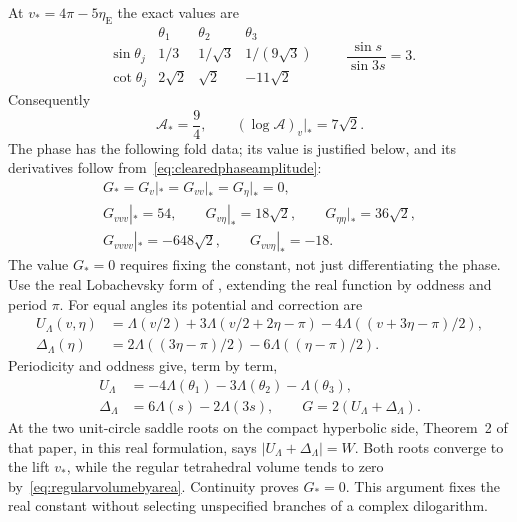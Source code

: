 At $v_*=4\pi-5\eta_{\mathrm E}$ the exact values are
\[
 \begin{array}{c|ccc}
 &\theta_1&\theta_2&\theta_3\\ \hline
 \sin\theta_j&1/3&1/\sqrt3&1/(9\sqrt3)\\
 \cot\theta_j&2\sqrt2&\sqrt2&-11\sqrt2
 \end{array}
 \qquad
 \frac{\sin s}{\sin3s}=3.
\]
Consequently
\begin{equation}
 \mathcal A_*=\frac94,\qquad
 (\log\mathcal A)_v\big|_*=7\sqrt2.
 \label{eq:regularAiryamplitude}
\end{equation}
The phase has the following fold data; its value is justified below,
and its derivatives follow from~\eqref{eq:clearedphaseamplitude}:
\begin{equation}
 \begin{gathered}
 G_*=G_v|_*=G_{vv}|_*=G_\eta|_*=0,\\
 G_{vvv}|_*=54,\qquad G_{v\eta}|_*=18\sqrt2,\qquad
 G_{\eta\eta}|_*=36\sqrt2,\\
 G_{vvvv}|_*=-648\sqrt2,\qquad G_{vv\eta}|_*=-18.
 \end{gathered}
 \label{eq:regularAiryderivatives}
\end{equation}
The value $G_*=0$ requires fixing the constant, not just
differentiating the phase. Use the real Lobachevsky form of
\cite[Section~1.2, (1.14)--(1.18)]{MurakamiYano}, extending
the real function by oddness and period $\pi$. For equal angles
its potential and correction are
\[
 \begin{split}
 U_\Lambda(v,\eta)
 &=\Lambda(v/2)+3\Lambda(v/2+2\eta-\pi)
       -4\Lambda((v+3\eta-\pi)/2),\\
 \Delta_\Lambda(\eta)
 &=2\Lambda((3\eta-\pi)/2)-6\Lambda((\eta-\pi)/2).
 \end{split}
\]
Periodicity and oddness give, term by term,
\[
 \begin{split}
 U_\Lambda&=-4\Lambda(\theta_1)-3\Lambda(\theta_2)
                         -\Lambda(\theta_3),\\
 \Delta_\Lambda&=6\Lambda(s)-2\Lambda(3s),\qquad
 G=2(U_\Lambda+\Delta_\Lambda).
 \end{split}
\]
At the two unit-circle saddle roots on the compact hyperbolic
side, Theorem~2 of that paper, in this real formulation, says
$|U_\Lambda+\Delta_\Lambda|=W$. Both roots converge to the
lift $v_*$, while the regular tetrahedral volume tends to zero
by~\eqref{eq:regularvolumebyarea}. Continuity proves $G_*=0$.
This argument fixes the real constant without selecting
unspecified branches of a complex dilogarithm.

